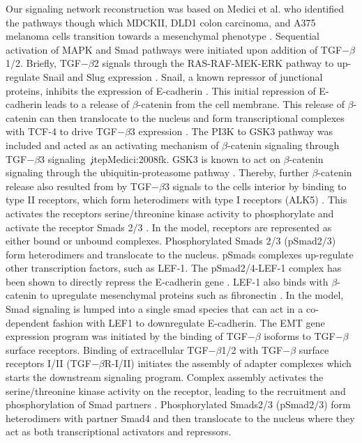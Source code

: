\documentclass[12pt]{article}
\begin{document}
Our signaling network reconstruction was based on Medici et al. who identified the pathways though which MDCKII, DLD1 colon carcinoma,
and A375 melanoma cells transition towards a mesenchymal phenotype \citep{Medici:2008fk}.
Sequential activation of MAPK and Smad pathways were initiated upon addition of TGF$-\beta$1/2.  Briefly, TGF$-\beta$2 signals through the RAS-RAF-MEK-ERK pathway to up-regulate Snail and Slug expression \citep{Medici:2006qa}.  Snail, a known repressor of junctional proteins, inhibits the expression of E-cadherin \citep{Cano:2000kh}. This initial repression of E-cadherin leads to a release of $\beta$-catenin from the cell membrane. This release of $\beta$-catenin can then translocate to the nucleus and form transcriptional complexes with TCF-4 to drive TGF$-\beta$3 expression \citep{Medici:2008fk}. The PI3K to GSK3 pathway was included and acted as an activating mechanism of $\beta$-catenin signaling through TGF$-\beta$3 signaling \c\
itep{Medici:2008fk}. GSK3 is known to act on $\beta$-catenin signaling through the ubiquitin-proteasome pathway
\citep{Zhou:2004kx,Larue:2005vn}. Thereby, further $\beta$-catenin release also resulted from by TGF$-\beta$3 signals to the cells interior by binding to type II receptors, which form heterodimers with type I receptors (ALK5) \citep{Derynck:2003fc}. This activates the receptors serine/threonine kinase activity to phosphorylate and activate the receptor Smads 2/3 \citep{Massague:2005qc}. In the model, receptors are represented as either bound or unbound complexes.
Phosphorylated Smads 2/3 (pSmad2/3) form heterodimers and translocate to the nucleus. pSmads complexes up-regulate other transcription factors, such as LEF-1. The pSmad2/4-LEF-1 complex has been shown to directly repress the E-cadherin gene \citep{Nawshad:2007kl}. LEF-1 also binds with $\beta$-catenin to upregulate mesenchymal proteins such as fibronectin \citep{Medici2011}.
In the model, Smad signaling is lumped into a single smad species that can act in a co-dependent fashion with LEF1 to downregulate E-cadherin.
The EMT gene expression program was initiated by the binding of TGF$-\beta$ isoforms to TGF$-\beta$ surface receptors.
Binding of extracellular TGF$-\beta$1/2 with TGF$-\beta$ surface receptors I/II (TGF$-\beta$R-I/II) initiates the assembly of adapter complexes which starts the
downstream signaling program.
Complex assembly activates the serine/threonine kinase activity on the receptor, leading to the recruitment and phosphorylation of Smad partners \citep{Massague:2005qc}.
Phosphorylated Smads2/3 (pSmad2/3) form heterodimers with partner Smad4 and then translocate to the nucleus where they act as both transcriptional activators and repressors.
\end{document}

